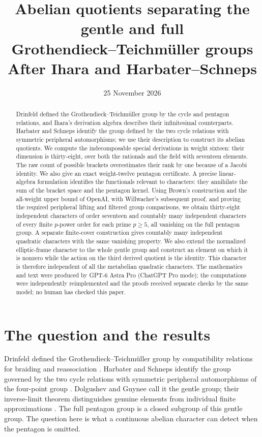 \documentclass[11pt]{article}
\title{Abelian quotients separating the gentle and full\\Grothendieck--Teichm\"uller groups\\
\large After Ihara and Harbater--Schneps}
\author{}
\date{25 November 2026}
\theoremstyle{definition}
\theoremstyle{remark}
\begin{document}
\maketitle
\begin{abstract}
Drinfeld defined the Grothendieck--Teichm\"uller group by the cycle and pentagon relations, and Ihara's derivation algebra describes their infinitesimal counterparts. Harbater and Schneps identify the group defined by the two cycle relations with symmetric peripheral automorphisms; we use their description to construct its abelian quotients. We compute the indecomposable special derivations in
weight sixteen: their dimension is thirty-eight, over both the rationals
and the field with seventeen elements.  The raw count of possible brackets
overestimates their rank by one because of a Jacobi identity.  We also give
an exact weight-twelve pentagon certificate.  A precise
linear-algebra formulation identifies the functionals relevant to
characters: they annihilate the sum of the bracket space and the pentagon
kernel.  Using Brown's construction and the all-weight upper bound of OpenAI,
with Willwacher's subsequent proof,
and proving the required peripheral lifting and filtered group comparisons,
we obtain thirty-eight independent characters of order seventeen and
countably many independent characters of every finite $p$-power order
for each prime $p\geq5$, all vanishing on the full pentagon group.
A separate finite-cover construction gives countably many independent
quadratic characters with the same vanishing property.
We also extend the normalized elliptic-frame character to the whole
gentle group and construct an element on which it is nonzero while
the action on the third derived quotient is the identity. This character
is therefore independent of all the metabelian quadratic characters.
The mathematics
and text were produced by GPT-6 Astra Pro (ChatGPT Pro mode); the computations
were independently reimplemented and the proofs received separate checks
by the same model; no human has checked this paper.
\end{abstract}

\section{The question and the results}
Drinfeld defined the Grothendieck--Teichm\"uller group by compatibility
relations for braiding and reassociation \cite[\S5]{Drinfeld}.
Harbater and Schneps identify the group governed by the two cycle relations
with symmetric peripheral automorphisms of the four-point group
\cite[Main Theorem]{HS}.  Dolgushev and Guynee call it the gentle group;
their inverse-limit theorem distinguishes genuine elements from individual
finite approximations \cite[Definition 2.5, Theorem 5.2, Corollary 5.4]{DG}.
The full pentagon group is a closed subgroup of this gentle group.
The question here is what a continuous abelian character can detect when
the pentagon is omitted.
\end{document}

